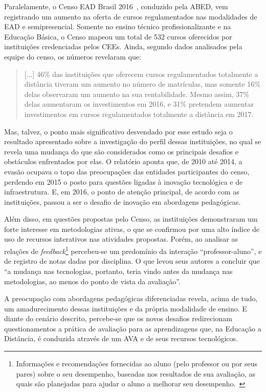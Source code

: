 Paralelamente, o Censo EAD Brasil 2016~\cite{abed2016censo}, conduzido pela \acrfull{ABED}, vem registrando um aumento na oferta de cursos regulamentados nas modalidades de \acrshort{EAD} e semipresencial. Somente no ensino técnico profissionalizante e na Educação Básica, o Censo mapeou um total de 532 cursos oferecidos por instituições credenciadas pelos \acrfull{CEEs}. Ainda, segundo dados analisados pela equipe do censo, os números revelaram que:

\begin{quote}
[...] 46{\%} das instituições que oferecem cursos regulamentados totalmente a distância tiveram um aumento no número de matrículas, mas somente 16{\%} delas observaram um aumento na sua rentabilidade. Mesmo assim, 37{\%} delas aumentaram os investimentos em 2016, e 31{\%} pretendem aumentar investimentos em cursos regulamentados totalmente a distância em 2017.
\end{quote}

Mas, talvez, o ponto mais significativo desvendado por esse estudo seja o resultado apresentado sobre a investigação do perfil dessas instituições, no qual se revela uma mudança do que são considerados como os principais desafios e obstáculos enfrentados por elas. O relatório aponta que, de 2010 até 2014, a evasão ocupava o topo das preocupações das entidades participantes do censo, perdendo em 2015 o posto para questões ligadas à inovação tecnológica e de infraestrutura. E, em 2016, o ponto de atenção principal, de acordo com as instituições, passou a ser o desafio de inovação em abordagens pedagógicas.

Além disso, em questões propostas pelo Censo, as instituições demonstraram um forte interesse em metodologias ativas, o que se confirmou por uma alto índice de uso de recursos interativos nas atividades propostas. Porém, ao analisar as relações de \textit{feedback}\footnote{Informações e recomendações fornecidas
ao aluno (pelo professor ou por seus pares) sobre o seu desempenho,
baseadas nos resultados de sua avaliação, as quais são planejadas para ajudar o aluno a melhorar seu desempenho.~\cite{grego@2013}} percebeu-se um predomínio da interação ``professor-aluno'', e de registro de notas dadas por disciplina. O que levou seus autores a concluir que
``a mudança nas tecnologias, portanto, teria vindo antes da mudança nas metodologias, ao menos do ponto de vista da avaliação''.

A preocupação com abordagens pedagógicas diferenciadas revela, acima de tudo, um amadurecimento dessas instituições e da própria modalidade de ensino. E diante do cenário descrito, percebe-se que os novos desafios redirecionam questionamentos a prática de avaliação para as aprendizagens que, na Educação a Distância, é conduzida através de um \acrfull{AVA} e de seus recursos tecnológicos. 

